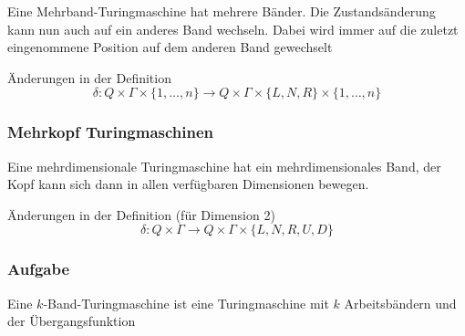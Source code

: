 \documentclass{beamer}
\begin{document}
{\begin{frame}
\begin{figure}[H]
\begin{center}
\end{center}
\end{figure}
Eine Mehrband-Turingmaschine hat mehrere Bänder. Die Zustandsänderung kann nun auch auf ein anderes Band wechseln. Dabei wird immer auf die zuletzt eingenommene Position auf dem anderen Band gewechselt 
\begin{block}{Änderungen in der Definition}
$$ \delta: Q \times \Gamma \times \{1, \ldots, n\} \rightarrow Q \times \Gamma \times \{L,N,R\} \times \{1, \ldots, n\}$$
\end{block}
\end{frame}
\begin{frame}
\frametitle{Mehrkopf Turingmaschinen}
\vspace{-2cm}
\begin{figure}[H]
\begin{center}
\end{center}
\end{figure}
Eine mehrdimensionale Turingmaschine hat ein mehrdimensionales Band, der Kopf kann sich dann in allen verfügbaren Dimensionen bewegen.
\begin{block}{Änderungen in der Definition (für Dimension 2)}
$$ \delta: Q \times \Gamma \rightarrow Q \times \Gamma \times \{L,N,R,U,D\}$$
\end{block}
\end{frame}

\begin{frame}
\frametitle{Aufgabe}
\vspace{-1cm}
Eine $k$-Band-Turingmaschine ist eine Turingmaschine mit $k$
Arbeitsbändern und der Übergangsfunktion


\end{frame}}
\end{document}
